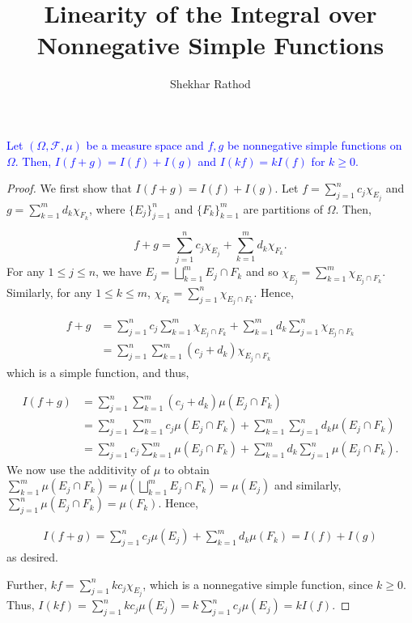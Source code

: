 \documentclass[12pt]{extarticle}
\title{Linearity of the Integral over Nonnegative Simple Functions}
\author{Shekhar Rathod}
\date{}
\newcommand{\F}{\mathscr{F}}
\begin{document}
\maketitle

\textcolor{blue}{Let $(\Omega, \F, \mu)$ be a measure space and $f, g$ be nonnegative simple functions on $\Omega$. Then, $I(f + g) = I(f) + I(g)$ and $I(kf) = kI(f)$ for $k \geq 0$.
}

\begin{proof}

We first show that $I(f + g) = I(f) + I(g)$. Let $f = \sum_{j = 1}^{n} c_j \chi_{E_j}$ and $g = \sum_{k = 1}^{m} d_k \chi_{F_k}$, where $\{E_j\}_{j = 1}^{n}$ and $\{F_k\}_{k = 1}^{m}$ are partitions of $\Omega$. Then, 

$$ f + g = \sum_{j=1}^{n} c_j \chi_{E_j} + \sum_{k=1}^{m} d_k \chi_{F_k}.$$
For any $1 \leq j \leq n$, we have $E_j = \bigsqcup_{k = 1}^{m} E_j \cap F_k$ and so $\chi_{E_j} = \sum_{k=1}^{m}\chi_{E_j \cap F_k}$. Similarly, for any $1 \leq k \leq m$, $\chi_{F_k} = \sum_{j=1}^{n}\chi_{E_j \cap F_k}$. Hence,

\begin{align*}
    f + g &= \sum_{j = 1}^{n} c_j\sum_{k=1}^{m}\chi_{E_j \cap F_k} + \sum_{k = 1}^{m} d_k \sum_{j = 1}^{n} \chi_{E_j \cap F_k} \\
    &= \sum_{j = 1}^{n}\sum_{k=1}^{m} (c_j + d_k) \chi_{E_j \cap F_k}
\end{align*}
which is a simple function, and thus, 

\begin{align*}
    I(f + g) &= \sum_{j = 1}^{n}\sum_{k=1}^{m} (c_j + d_k) \mu(E_j \cap F_k) \\
    &= \sum_{j = 1}^{n}\sum_{k=1}^{m} c_j \mu(E_j \cap F_k) + \sum_{k = 1}^{m}\sum_{j=1}^{n} d_k \mu(E_j \cap F_k) \\
    &= \sum_{j=1}^{n}c_j \sum_{k=1}^{m}\mu(E_j \cap F_k) + \sum_{k=1}^{m} d_k \sum_{j=1}^{n} \mu(E_j \cap F_k).
\end{align*}
We now use the additivity of $\mu$ to obtain $\sum_{k = 1}^m \mu(E_j \cap F_k) = \mu(\bigsqcup_{k=1}^m E_j \cap F_k) = \mu(E_j)$ and similarly, $\sum_{j=1}^{n} \mu(E_j \cap F_k) = \mu(F_k)$. Hence, 

\begin{align*}
    I(f + g) = \sum_{j = 1}^n c_j \mu(E_j) + \sum_{k = 1}^{m} d_k \mu(F_k) = I(f) + I(g)
\end{align*}
as desired.

Further, $kf = \sum_{j = 1}^{n} kc_j \chi_{E_j}$, which is a nonnegative simple function, since $k \geq 0$. Thus, $I(kf) = \sum_{j = 1}^n kc_j \mu(E_j) = k \sum_{j = 1}^n c_j\mu(E_j) = kI(f).$

\end{proof}
\end{document}
